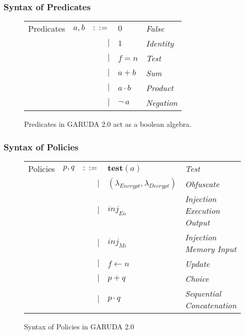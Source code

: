 \documentclass[12pt, letterpaper]{article}
\def \sysname {\textsc{GARUDA 2.0}\xspace}
\begin{document}
      \subsubsection{Syntax of Predicates}\label{sec:spec:synt:pred}
        \begin{figure}
          \centering
          \begin{tabular}{l c r l l}
            Predicates  & $a,b$ & $::=$  & $0$          & \textit{False}    \\
                        &       & $\mid$ & $1$          & \textit{Identity} \\
                        &       & $\mid$ & $f = n$      & \textit{Test}     \\
                        &       & $\mid$ & $a + b$      & \textit{Sum}      \\
                        &       & $\mid$ & $a \cdot b$  & \textit{Product}  \\
                        &       & $\mid$ & $\neg\ a$    & \textit{Negation}
          \end{tabular}
          \caption{Predicates in \sysname act as a boolean algebra.}
          \label{fig:spec:synt:pred}
        \end{figure}

      \subsubsection{Syntax of Policies}\label{sec:spec:synt:pol}
        \begin{figure}
          \centering
          \begin{tabular}{l c r l l}
            Policies  & $p,q$ & $::=$  & $\mathbf{test}(a)$    & \textit{Test}     \\
                      &       & $\mid$ & $(\lambda_{Encrypt}, 
                                           \lambda_{Decrypt})$ & \textit{Obfuscate} \\
                      &       & $\mid$ & $inj_{Eo}$            & \textit{Injection Execution Output} \\
                      &       & $\mid$ & $inj_{Mi}$            & \textit{Injection Memory Input} \\
                      &       & $\mid$ & $f \leftarrow n$      & \textit{Update}   \\
                      &       & $\mid$ & $p + q$               & \textit{Choice}   \\
                      &       & $\mid$ & $p \cdot q$           & \textit{Sequential Concatenation} \\
          \end{tabular}
          \caption{Syntax of Policies in \sysname}
          \label{fig:spec:synt:pol}
        \end{figure}
\end{document}
